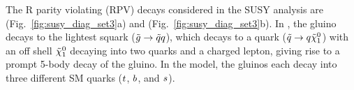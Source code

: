 The R parity violating (RPV) decays considered in the SUSY analysis are \ToqqqqL
(Fig.~\ref{fig:susy_diag_set3}a) and \Totbs (Fig.~\ref{fig:susy_diag_set3}b). In
\ToqqqqL, the gluino decays to the lightest squark ($\tilde{g} \to \tilde{q}
q$), which decays to a quark ($\tilde{q} \to q \tilde{\chi}_1^0$)
with an off shell $\tilde{\chi}_1^0$ decaying into two quarks and a charged
lepton, giving rise to a prompt 5-body decay of the gluino. In the \Totbs model, the
gluinos each decay into three different SM quarks ($t$, $b$, and $s$).

\begin{figure}[htb!]
    \centering
     \\
     \\

\end{figure}
